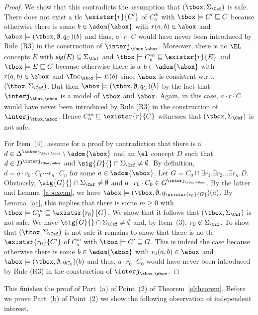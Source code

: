 \documentclass{lmcs}
\theoremstyle{definition}
\begin{document}
\begin{proof}
    We show that this contradicts the assumption that $(\tbox,\Sigma_\Csf)$ is safe.
    There does not exist a tlc $\existsr{r}{C'}$ of $C_a^m$ with
    $\tbox\models C'\sqsubseteq C$ because otherwise there is some
    $b\in\adom{\abox}$ with $r(a,b)\in\abox$ and $\abox\models
    (\tbox,\emptyset,q_{C})(b)$ and thus, $a\cdot r\cdot C$ would have
    never been introduced by Rule (R3) in the construction of
    $\interj_{\tbox,\abox}$. Moreover, there is no
    $\EL$ concepts $E$ with ${\sf sig}(E)\subseteq \Sigma_\Csf$ and $\tbox\models C_a^m\sqsubseteq
    \existsr{r}{E}$ and $\tbox\models E\sqsubseteq C$ because
    otherwise there is a $b\in\adom{\abox}$ with $r(a,b)\in\abox$ and
    $\Imc_{\abox}\models E(b)$ since $\abox$ is
    consistent w.r.t.\ $(\tbox,\Sigma_\Csf)$. But then $\abox\models
    (\tbox,\emptyset,q_{C})(b)$ by the fact that $\interj_{\tbox,\abox}$
    is a model of $\tbox$ and $\abox$. Again, in this case, $a\cdot
    r\cdot C$ would have never been introduced by Rule (R3) in the
    construction of $\interj_{\tbox,\abox}$.
    Hence $C_a^m\sqsubseteq\existsr{r}{C}$ witnesses that $(\tbox,\Sigma_\Csf)$ is not safe.

    For Item~(4), assume for a proof by contradiction that there is a
    $d\in\Delta^{\interj_{\tbox,\abox}}\setminus\adom{\abox}$ and an
    $\el$ concept $D$ such that $d\in D^{\interj_{\tbox,\abox}}$ and
    $\sig{D}{}\cap\Sigma_\Csf\neq\emptyset$. By definition, $d=a\cdot
    r_0\cdot C_0\cdots r_n\cdot C_n$ for some $a\in\adom{\abox}$. Let
    $G=C_0\sqcap \exists r_1.\exists r_2\ldots\exists
    r_n.D$. Obviously, $\sig{G}{}\cap\Sigma_\Csf\neq\emptyset$ and
    $a\cdot r_0\cdot C_0\in G^{\interj_{\tbox,\abox}}$. By the
    latter and Lemma~\ref{aboxcan}, we have $\abox\models
    (\tbox,\emptyset,q_{\existsr{r_0}{G}})(a)$. By Lemma~\ref{ac}, this implies
    that there is some $m\geq 0$ with $\tbox\models
    C_a^m\sqsubseteq\existsr{r_0}{G}$. We show that it follows that $(\tbox,\Sigma_\Csf)$ is not safe.
    We have $\sig{G}{}\cap\Sigma_\Csf\neq\emptyset$ and, by Item~(3),
    $r_{0}\not\in \Sigma_\Csf$. To show that $(\tbox,\Sigma_\Csf)$ is not safe it remains to show that there
    is no tlc $\existsr{r_0}{C'}$ of $C_a^m$ with $\tbox\models
    C'\sqsubseteq G$. This is indeed the case because otherwise there
    is some $b\in\adom{\abox}$ with $r_0(a,b)\in\abox$ and
    $\abox\models (\tbox,\emptyset,q_{C_0})(b)$ and thus, $a\cdot r_0\cdot
    C_0$ would have never been introduced by Rule (R3) in the construction of $\interj_{\tbox,\abox}$. 
  \end{proof}
This finishes the proof of Part~(a) of Point~(2) of Theorem~\ref{eltheorem}.
Before we prove Part~(b) of Point~(2) we show the following 
observation of independent interest.
\end{document}
